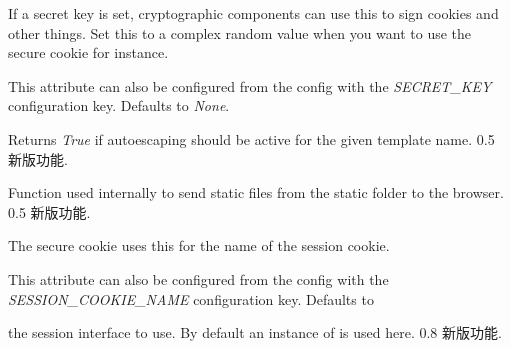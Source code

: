 \documentclass[a4paper,12pt]{sphinxmanual}
\begin{document}
\begin{fulllineitems}

\begin{fulllineitems}
\label{api:flask.Flask.secret_key}
If a secret key is set, cryptographic components can use this to
sign cookies and other things.  Set this to a complex random value
when you want to use the secure cookie for instance.

This attribute can also be configured from the config with the
\emph{SECRET\_KEY} configuration key.  Defaults to \emph{None}.

\end{fulllineitems}


\begin{fulllineitems}
\label{api:flask.Flask.select_jinja_autoescape}
Returns \emph{True} if autoescaping should be active for the given
template name.
0.5 新版功能.
\end{fulllineitems}


\begin{fulllineitems}
\label{api:flask.Flask.send_static_file}
Function used internally to send static files from the static
folder to the browser.
0.5 新版功能.
\end{fulllineitems}


\begin{fulllineitems}
\label{api:flask.Flask.session_cookie_name}
The secure cookie uses this for the name of the session cookie.

This attribute can also be configured from the config with the
\emph{SESSION\_COOKIE\_NAME} configuration key.  Defaults to 

\end{fulllineitems}


\begin{fulllineitems}
\label{api:flask.Flask.session_interface}
the session interface to use.  By default an instance of
{\hyperref[api:flask.sessions.SecureCookieSessionInterface]{}} is used here.
0.8 新版功能.
\end{fulllineitems}


\end{fulllineitems}
\end{document}
